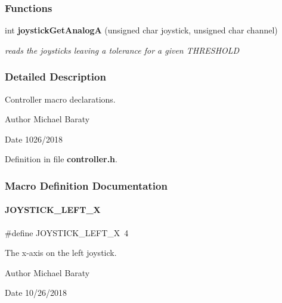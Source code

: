 \subsubsection*{Functions}
\begin{DoxyCompactItemize}
\item 
int \textbf{ joystick\+Get\+AnalogA} (unsigned char joystick, unsigned char channel)
\begin{DoxyCompactList}\small\item\em reads the joysticks leaving a tolerance for a given T\+H\+R\+E\+S\+H\+O\+LD \end{DoxyCompactList}\end{DoxyCompactItemize}


\subsubsection{Detailed Description}
Controller macro declarations. 

\begin{DoxyAuthor}{Author}
Michael Baraty 
\end{DoxyAuthor}
\begin{DoxyDate}{Date}
1026/2018 
\end{DoxyDate}


Definition in file \textbf{ controller.\+h}.



\subsubsection{Macro Definition Documentation}
\mbox{\label{controller_8h_a20c53ff73325230502157f3bab8c6f6e}} 
\paragraph{J\+O\+Y\+S\+T\+I\+C\+K\+\_\+\+L\+E\+F\+T\+\_\+X}
{\footnotesize\ttfamily \#define J\+O\+Y\+S\+T\+I\+C\+K\+\_\+\+L\+E\+F\+T\+\_\+X~4}



The x-\/axis on the left joystick. 

\begin{DoxyAuthor}{Author}
Michael Baraty 
\end{DoxyAuthor}
\begin{DoxyDate}{Date}
10/26/2018 
\end{DoxyDate}


